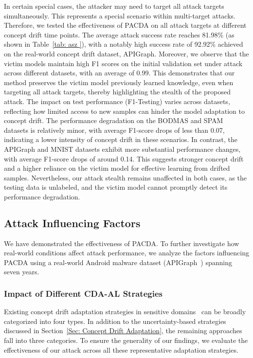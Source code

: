 \documentclass[conference,compsoc]{IEEEtran} %
\begin{document}
In certain special cases, the attacker may need to target all attack targets simultaneously.
This represents a special scenario within multi-target attacks.
Therefore, we tested the effectiveness of PACDA on all attack targets at different concept drift time points.
The average attack success rate reaches 81.98\% (as shown in Table~\ref{tab: asz }), with a notably high success rate of 92.92\% achieved on the real-world concept drift dataset, APIGraph.  
Moreover, we observe that the victim models maintain high F1 scores on the initial validation set under attack across different datasets, with an average of 0.99.
This demonstrates that our method preserves the victim model  previously learned knowledge, even when targeting all attack targets, thereby highlighting the stealth of the proposed attack.
The impact on test performance (F1-Testing) varies across datasets, reflecting how limited access to new samples can hinder the model  adaptation to concept drift.
The performance degradation on the BODMAS and SPAM datasets is relatively minor, with average F1-score drops of less than 0.07, indicating a lower intensity of concept drift in these scenarios.
In contrast, the APIGraph and MNIST datasets exhibit more substantial performance changes, with average F1-score drops of around 0.14.
This suggests stronger concept drift and a higher reliance on the victim model for effective learning from drifted samples.
Nevertheless, our attack stealth remains unaffected in both cases, as the testing data is unlabeled, and the victim model cannot promptly detect its performance degradation.

\subsection{Attack Influencing Factors}
\label{Sec: Attack Influencing Factors}

We have demonstrated the effectiveness of PACDA.
To further investigate how real-world conditions affect attack performance, we analyze the factors influencing PACDA using a real-world Android malware dataset (APIGraph~\cite{2020-CCS-APIGraph}) spanning seven years.

\subsubsection{Impact of Different CDA-AL Strategies}
Existing concept drift adaptation strategies in sensitive domains~\cite{2023-Usenix-chenyizhen,2022-SP-Trancending,2021-Usenix-CDAE} can be broadly categorized into four types. 
In addition to the uncertainty-based strategies discussed in Section~\ref{Sec: Concept Drift Adaptation}, the remaining approaches fall into three categories. 
To ensure the generality of our findings, we evaluate the effectiveness of our attack across all these representative adaptation strategies.
\end{document}
